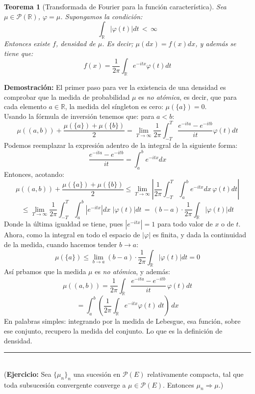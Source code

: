 \documentclass[a4paper]{article}
\newtheorem{teorema}{Teorema}
\numberwithin{equation}{subsection}
\numberwithin{definicion}{subsection}
\def\R{\mathbb R}
\def\to{\rightarrow}
\begin{document}
\begin{teorema}[Transformada de Fourier para la función característica] Sea $\mu\in\mathcal{P}(\R)$, $\varphi = \hat{\mu}$. Supongamos la condición:
\[\int_{\R}|\varphi (t)|dt\,<\,\infty\]
Entonces existe $f$, densidad de $\mu$. Es decir; $\mu(dx) = f(x)dx$, y además se tiene que:
\[f(x) = \frac{1}{2\pi}\int_{\R}e^{-itx}\varphi (t) dt\]
\end{teorema}
\textbf{Demostración: }El primer paso para ver la existencia de una densidad es comprobar que la medida de probabilidad $\mu$ es \textit{no atómica}, es decir, que para cada elemento $a\in\R$, la medida del síngleton es cero: $\mu(\{a\})=0$.\\
Usando la fórmula de inversión tenemos que: para $a<b$:
\[\mu((a,b)) + \frac{\mu(\{a\})+\mu(\{b\})}{2} = \lim_{T\to\infty} \frac{1}{2\pi}\int_{-T}^{T}\frac{e^{-ita}-e^{-itb}}{it}\varphi(t)dt\]
Podemos reemplazar la expresión adentro de la integral de la siguiente forma:
\[\frac{e^{-ita}-e^{-itb}}{it} = \int_{a}^{b}e^{-itx}dx\]
Entonces, acotando:
\[\mu((a,b)) + \frac{\mu(\{a\})+\mu(\{b\})}{2} \leq \lim_{T\to\infty} \left|\frac{1}{2\pi}\int_{-T}^{T}\int_{a}^{b}e^{-itx}dx\,\varphi(t)dt\right|\]
\[\leq \lim_{T\to\infty}\frac{1}{2\pi}\int_{-T}^{T}\int_{a}^{b}|e^{-itx}|dx\,\,|\varphi(t)|dt \,=\,(b-a)\cdot \frac{1}{2\pi}\int_{\R}|\varphi(t)|dt\]
Donde la última igualdad se tiene, pues $|e^{-itx}|=1$ para todo valor de $x$ o de $t$. Ahora, como la integral en todo el espacio de $|\varphi|$ es finita, y dada la continuidad de la medida, cuando hacemos tender $b\rightarrow a$:
\[\mu(\{a\}) \leq \lim_{b\to a} (b-a)\cdot \frac{1}{2\pi}\int_{\R}|\varphi(t)|dt = 0\]
Así prbamos que la medida $\mu$ es \textit{no atómica}, y además:
\[\mu((a,b)) = \frac{1}{2\pi}\int_{\R}\frac{e^{-ita}-e^{-itb}}{it}\,\varphi(t)dt\]
\[= \int_{a}^{b}\left(\frac{1}{2\pi}\int_{\R}e^{-itx}\varphi(t)\,dt\right)\,dx\]
En palabras simples: integrando por la medida de Lebesgue, esa función, sobre ese conjunto, recupero la medida del conjunto. Lo que es la definición de densidad.
\rule{0.7em}{0.7em}\\ \newline
(\textbf{Ejercicio:} Sea $\{\mu_n\}_n$ una sucesión en $\mathcal{P}(E)$ relativamente compacta, tal que toda subsucesión convergente converge a $\mu \in \mathcal{P}(E)$. Entonces $\mu_n \Rightarrow\mu$.)
\end{document}
